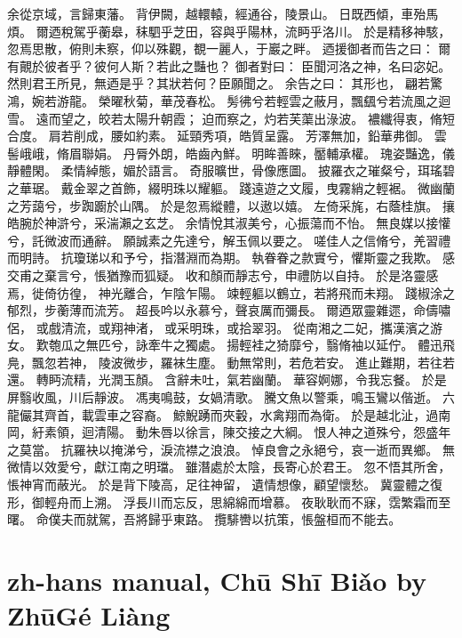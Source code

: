 \documentclass[a4paper,12pt, fontset=none, hyperref]{ctexbook}
\begin{document}
		余從京域，言歸東藩。
		背伊闕，越轘轅，經通谷，陵景山。
		日既西傾，車殆馬煩。
		爾迺稅駕乎蘅皋，秣駟乎芝田，容與乎陽林，流眄乎洛川。
		於是精移神駭，忽焉思散，俯則未察，仰以殊觀，覩一麗人，于巖之畔。
		迺援御者而告之曰：
		爾有覿於彼者乎？彼何人斯？若此之豔也？
		御者對曰：
		臣聞河洛之神，名曰宓妃。然則君王所見，無迺是乎？其狀若何？臣願聞之。
		余告之曰：
		其形也，
		翩若驚鴻，婉若游龍。
		榮曜秋菊，華茂春松。
		髣彿兮若輕雲之蔽月，飄颻兮若流風之迴雪。
		遠而望之，皎若太陽升朝霞；
		迫而察之，灼若芙蕖出淥波。
		襛纖得衷，脩短合度。
		肩若削成，腰如約素。
		延頸秀項，皓質呈露。
		芳澤無加，鉛華弗御。
		雲髻峨峨，脩眉聯娟。
		丹脣外朗，皓齒內鮮。
		明眸善睞，靨輔承權。
		瑰姿豔逸，儀靜體閑。
		柔情綽態，媚於語言。
		奇服曠世，骨像應圖。
		披羅衣之璀粲兮，珥瑤碧之華琚。
		戴金翠之首飾，綴明珠以耀軀。
		踐遠遊之文履，曳霧綃之輕裾。
		微幽蘭之芳藹兮，步踟躕於山隅。
		於是忽焉縱體，以遨以嬉。
		左倚采旄，右蔭桂旗。
		攘皓腕於神滸兮，采湍瀨之玄芝。
		余情悅其淑美兮，心振蕩而不怡。
		無良媒以接懽兮，託微波而通辭。
		願誠素之先達兮，解玉佩以要之。
		嗟佳人之信脩兮，羌習禮而明詩。
		抗瓊珶以和予兮，指潛淵而為期。
		執眷眷之款實兮，懼斯靈之我欺。
		感交甫之棄言兮，悵猶豫而狐疑。
		收和顏而靜志兮，申禮防以自持。
		於是洛靈感焉，徙倚彷徨，
		神光離合，乍陰乍陽。
		竦輕軀以鶴立，若將飛而未翔。
		踐椒涂之郁烈，步蘅薄而流芳。
		超長吟以永慕兮，聲哀厲而彌長。
		爾迺眾靈雜遝，命儔嘯侶，
		或戲清流，或翔神渚，
		或采明珠，或拾翠羽。
		從南湘之二妃，攜漢濱之游女。
		歎匏瓜之無匹兮，詠牽牛之獨處。
		揚輕袿之猗靡兮，翳脩袖以延佇。
		體迅飛鳧，飄忽若神，
		陵波微步，羅袜生塵。
		動無常則，若危若安。
		進止難期，若往若還。
		轉眄流精，光潤玉顏。
		含辭未吐，氣若幽蘭。
		華容婀娜，令我忘餐。
		於是屏翳收風，川后靜波。
		馮夷鳴鼓，女媧清歌。
		騰文魚以警乘，鳴玉鸞以偕逝。
		六龍儼其齊首，載雲車之容裔。
		鯨鯢踴而夾轂，水禽翔而為衛。
		於是越北沚，過南岡，紆素領，迴清陽。
		動朱唇以徐言，陳交接之大綱。
		恨人神之道殊兮，怨盛年之莫當。
		抗羅袂以掩涕兮，淚流襟之浪浪。
		悼良會之永絕兮，哀一逝而異鄉。
		無微情以效愛兮，獻江南之明璫。
		雖潛處於太陰，長寄心於君王。
		忽不悟其所舍，悵神宵而蔽光。
		於是背下陵高，足往神留，
		遺情想像，顧望懷愁。
		冀靈體之復形，御輕舟而上溯。
		浮長川而忘反，思綿綿而增慕。
		夜耿耿而不寐，霑繁霜而至曙。
		命僕夫而就駕，吾將歸乎東路。
		攬騑轡以抗策，悵盤桓而不能去。

	\chapter{zh-hans manual, Chū Shī Biǎo by ZhūGé Liàng}
	
\end{document}
